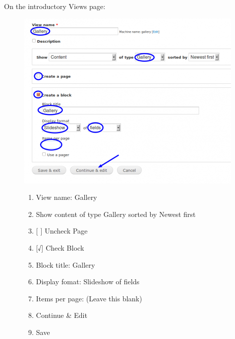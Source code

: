 \documentclass[letterpaper,10pt,english]{sphinxmanual}
\begin{document}
On the introductory Views page:
\begin{figure}[htbp]
\centering

\includegraphics{slideshow-3.1-412x328.png}
{\small \begin{enumerate}
\item {} 
View name: Gallery

\item {} 
Show content of type Gallery sorted by Newest first

\item {} 
{[}  {]}   Uncheck Page

\item {} 
{[}√{]}  Check Block

\item {} 
Block title: Gallery

\item {} 
Display fomat: Slideshow of fields

\item {} 
Items per page: (Leave this blank)

\item {} 
Continue \& Edit

\item {} 
Save

\end{enumerate}
}\end{figure}
\end{document}
